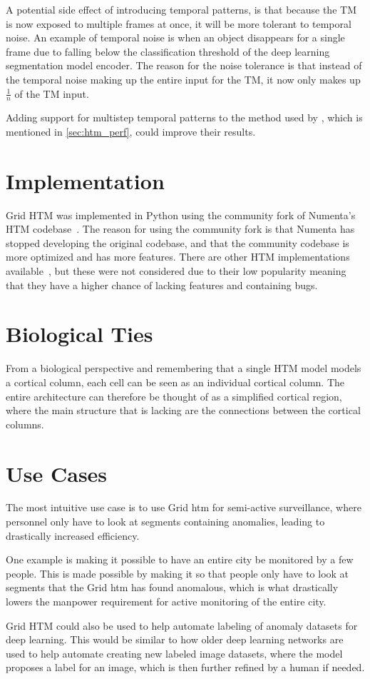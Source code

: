 \par
A potential side effect of introducing temporal patterns, is that because the TM is now exposed to multiple frames at once, it will be more tolerant to temporal noise. An example of temporal noise is when an object disappears for a single frame due to falling below the classification threshold of the deep learning segmentation model encoder. The reason for the noise tolerance is that instead of the temporal noise making up the entire input for the TM, it now only makes up $\frac{1}{n}$ of the TM input.
\par
Adding support for multistep temporal patterns to the method used by \textcite{MotionAnomalyDetection}, which is mentioned in \autoref{sec:htm_perf}, could improve their results.
\section{Implementation}
Grid HTM was implemented in Python using the community fork of Numenta's HTM codebase~\cite{htm_community_fork}. The reason for using the community fork is that Numenta has stopped developing the original codebase, and that the community codebase is more optimized and has more features. There are other HTM implementations available~\cite{htm_community_cuda,htm_community_brainblocks}, but these were not considered due to their low popularity meaning that they have a higher chance of lacking features and containing bugs.
\section{Biological Ties}
From a biological perspective and remembering that a single HTM model models a cortical column, each cell can be seen as an individual cortical column. The entire architecture can therefore be thought of as a simplified cortical region, where the main structure that is lacking are the connections between the cortical columns.
\section{Use Cases}
The most intuitive use case is to use Grid \gls*{htm} for semi-active surveillance, where personnel only have to look at segments containing anomalies, leading to drastically increased efficiency.
\par
One example is making it possible to have an entire city be monitored by a few people. This is made possible by making it so that people only have to look at segments that the Grid \gls*{htm} has found anomalous, which is what drastically lowers the manpower requirement for active monitoring of the entire city.
\par
Grid HTM could also be used to help automate labeling of anomaly datasets for deep learning. This would be similar to how older deep learning networks are used to help automate creating new labeled image datasets, where the model proposes a label for an image, which is then further refined by a human if needed.
